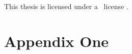 \documentclass[nopalatino,nolot,nolof,color]{fithesis3}
\begin{document}
 \makeatletter
  \thesis@blocks@cover
  \thesis@blocks@titlePage
  \thesis@blocks@frontMatter
  \begin{center}
    \begin{minipage}{\textwidth}
      This thesis is licensed under a \doclicenseLongNameRef~license \doclicenseIcon.%
    \end{minipage}
  \end{center}
  \thesis@blocks@assignment
  \thesis@blocks@declaration
  \thesis@blocks@thanks
  \thesis@blocks@clearRight
  \thesis@blocks@abstract
  \thesis@blocks@keywords
  \thesis@blocks@tables
  \thesis@blocks@mainMatter
 \makeatother

 
 
 
 
 
 
 

 
 

 \appendix
 \chapter{Appendix One}
 \lipsum[1]

 \todos
\end{document}
